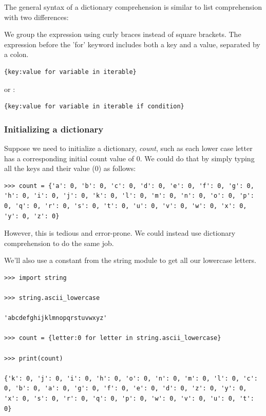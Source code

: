 \documentclass{article}
\begin{document}
The general syntax of a dictionary comprehension is similar to list comprehension with two differences:

We group the expression using curly braces instead of square brackets.
The expression before the 'for' keyword includes both a key and a value, separated by a colon.

\begin{lstlisting}
{key:value for variable in iterable}
\end{lstlisting}

or : 

\begin{lstlisting}
{key:value for variable in iterable if condition}
\end{lstlisting}


\subsubsection{Initializing a dictionary}

Suppose we need to initialize a dictionary, \textit{count}, such as each lower case letter has a corresponding initial count value of 0. We could do that by simply typing all the keys and their value (0) as follows:

\begin{lstlisting}
>>> count = {'a': 0, 'b': 0, 'c': 0, 'd': 0, 'e': 0, 'f': 0, 'g': 0, 'h': 0, 'i': 0, 'j': 0, 'k': 0, 'l': 0, 'm': 0, 'n': 0, 'o': 0, 'p': 0, 'q': 0, 'r': 0, 's': 0, 't': 0, 'u': 0, 'v': 0, 'w': 0, 'x': 0, 'y': 0, 'z': 0} 
\end{lstlisting}

However, this is tedious and error-prone. We could instead use dictionary comprehension to do the same job. 

We’ll also use a constant from the string module to get all our lowercase letters.

\begin{lstlisting}
>>> import string 

>>> string.ascii_lowercase 

'abcdefghijklmnopqrstuvwxyz'

>>> count = {letter:0 for letter in string.ascii_lowercase} 

>>> print(count) 

{'k': 0, 'j': 0, 'i': 0, 'h': 0, 'o': 0, 'n': 0, 'm': 0, 'l': 0, 'c': 0, 'b': 0, 'a': 0, 'g': 0, 'f': 0, 'e': 0, 'd': 0, 'z': 0, 'y': 0, 'x': 0, 's': 0, 'r': 0, 'q': 0, 'p': 0, 'w': 0, 'v': 0, 'u': 0, 't': 0}
\end{lstlisting}
\end{document}
